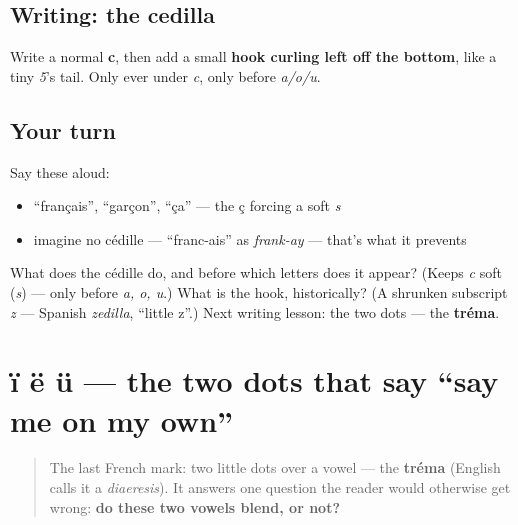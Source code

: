 \subsection*{Writing: the cedilla}

Write a normal \textbf{c}, then add a small \textbf{hook curling left off the bottom}, like a tiny \emph{5}'s tail. Only ever under \emph{c}, only before \emph{a/o/u}.

\subsection*{Your turn}
Say these aloud:

\begin{itemize}
\raggedright
  \item \textquotedblleft{}français\textquotedblright{}, \textquotedblleft{}garçon\textquotedblright{}, \textquotedblleft{}ça\textquotedblright{} — the ç forcing a soft \emph{s}
  \item imagine no cédille — \textquotedblleft{}franc-ais\textquotedblright{} as \emph{frank-ay} — that's what it prevents
\end{itemize}

\begin{tcolorbox}[breakable,colback=teal!4,colframe=teal!35!black,title={Before you move on}]
What does the cédille do, and before which letters does it appear? (Keeps \emph{c} soft (\emph{s}) — only before \emph{a, o, u}.) What is the hook, historically? (A shrunken subscript \emph{z} — Spanish \emph{zedilla}, \textquotedblleft{}little z\textquotedblright{}.) Next writing lesson: the two dots — the \textbf{tréma}.
\end{tcolorbox}
\section[ï ë ü]{ï ë ü — the two dots that say \textquotedblleft{}say me on my own\textquotedblright{}}

\label{lesson:FR-W03-trema}



\begin{quote}
The last French mark: two little dots over a vowel — the \textbf{tréma} (English calls it a \emph{diaeresis}). It answers one question the reader would otherwise get wrong: \textbf{do these two vowels blend, or not?}
\end{quote}

